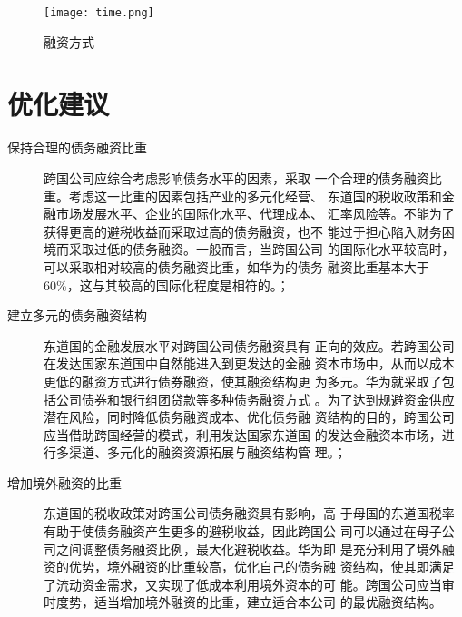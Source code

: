 \documentclass[../main]{subfiles}
\begin{document}
\begin{figure}[htbp]
	\centering
	\texttt{[image: time.png]}
	\caption{融资方式}
	\label{fig:融资方式}
\end{figure}

\section{优化建议}%
\label{sec:优化建议}

\begin{description}

	\item[保持合理的债务融资比重]跨国公司应综合考虑影响债务水平的因素，采取
		一个合理的债务融资比重。考虑这一比重的因素包括产业的多元化经营、
		东道国的税收政策和金融市场发展水平、企业的国际化水平、代理成本、
		汇率风险等。不能为了获得更高的避税收益而采取过高的债务融资，也不
		能过于担心陷入财务困境而采取过低的债务融资。一般而言，当跨国公司
		的国际化水平较高时，可以采取相对较高的债务融资比重，如华为的债务
		融资比重基本大于60\%，这与其较高的国际化程度是相符的。；

	\item[建立多元的债务融资结构]东道国的金融发展水平对跨国公司债务融资具有
		正向的效应。若跨国公司在发达国家东道国中自然能进入到更发达的金融
		资本市场中，从而以成本更低的融资方式进行债券融资，使其融资结构更
		为多元。华为就采取了包括公司债券和银行组团贷款等多种债务融资方式
		。为了达到规避资金供应潜在风险，同时降低债务融资成本、优化债务融
		资结构的目的，跨国公司应当借助跨国经营的模式，利用发达国家东道国
		的发达金融资本市场，进行多渠道、多元化的融资资源拓展与融资结构管
		理。；

	\item[增加境外融资的比重]东道国的税收政策对跨国公司债务融资具有影响，高
		于母国的东道国税率有助于使债务融资产生更多的避税收益，因此跨国公
		司可以通过在母子公司之间调整债务融资比例，最大化避税收益。华为即
		是充分利用了境外融资的优势，境外融资的比重较高，优化自己的债务融
		资结构，使其即满足了流动资金需求，又实现了低成本利用境外资本的可
		能。跨国公司应当审时度势，适当增加境外融资的比重，建立适合本公司
		的最优融资结构。

\end{description}
\end{document}
